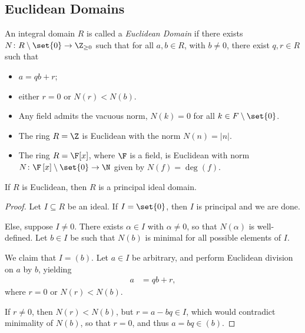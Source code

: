 \documentclass[10pt]{mypackage}
\begin{document}
\subsection{Euclidean Domains}%
\begin{definition}
  An integral domain $R$ is called a \textit{Euclidean Domain} if there exists $N\colon R\setminus \set{0}\rightarrow \Z_{\geq 0}$ such that for all $a,b\in R$, with $b\neq 0$, there exist $q,r\in R$ such that
  \begin{itemize}
    \item $a = qb + r$;
    \item either $r = 0$ or $N(r) < N(b)$.
  \end{itemize}
\end{definition}
\begin{example}\hfill
  \begin{itemize}
    \item Any field admits the vacuous norm, $N(k) = 0$ for all $k\in F\setminus \set{0}$.
    \item The ring $R = \Z$ is Euclidean with the norm $N(n) = \left\vert n \right\vert$. 
    \item The ring $R = \F[x]$, where $\F$ is a field, is Euclidean with norm $N\colon \F\left[ x \right]\setminus \set{0}\rightarrow \N$ given by $N(f) = \deg(f)$.
  \end{itemize}
\end{example}
\begin{theorem}
  If $R$ is Euclidean, then $R$ is a principal ideal domain.
\end{theorem}
\begin{proof}
  Let $I\subseteq R$ be an ideal. If $I = \set{0}$, then $I$ is principal and we are done.%

  Else, suppose $I\neq 0$. There exists $\alpha\in I$ with $\alpha\neq 0$, so that $N(\alpha)$ is well-defined. Let $b\in I$ be such that $N(b)$ is minimal for all possible elements of $I$.%

  We claim that $I = \left( b \right)$. Let $a\in I$ be arbitrary, and perform Euclidean division on $a$ by $b$, yielding
  \begin{align*}
    a &= qb + r,
  \end{align*}
  where $r = 0$ or $N(r) < N(b)$.%

  If $r\neq 0$, then $N(r) < N(b)$, but $r = a - bq\in I$, which would contradict minimality of $N(b)$, so that $r = 0$, and thus $a = bq\in \left( b \right)$.
\end{proof}
\end{document}
